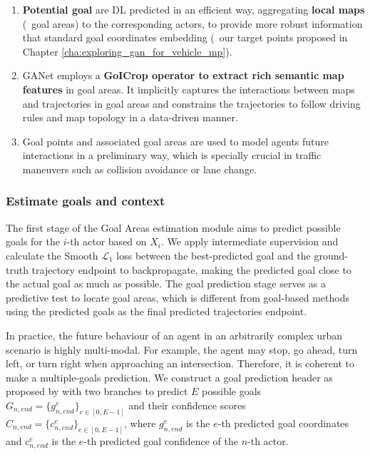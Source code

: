 \begin{enumerate}
	
	\item \textbf{Potential goal} are \ac{DL} predicted in an efficient way, aggregating \textbf{local maps} (\aka \ goal areas) to the corresponding actors, to provide more robust information that standard goal coordinates embedding (\eg \ our target points proposed in Chapter \ref{cha:exploring_gan_for_vehicle_mp}).
	
	\item GANet \cite{wang2022ganet} employs a \textbf{GoICrop operator to extract rich semantic map features} in goal areas. It implicitly captures the interactions between maps and trajectories in goal areas and constrains the trajectories to follow driving rules and map topology in a data-driven manner.
	
	\item Goal points and associated goal areas are used to model agents future interactions in a preliminary way, which is specially crucial in traffic maneuvers such as collision avoidance or lane change.
	
\end{enumerate}

\subsubsection{Estimate goals and context}
\label{subsubsec:7_improving_efficiency_estimate_goals}

The first stage of the Goal Areas estimation module aims to predict possible goals for the $i$-th actor based on $X_i$. We apply intermediate supervision and calculate the Smooth $\mathcal{L}_1$ loss between the best-predicted goal and the ground-truth trajectory endpoint to backpropagate, making the predicted goal close to the actual goal as much as possible. The goal prediction stage serves as a predictive test to locate goal areas, which is different from goal-based methods using the predicted goals as the final predicted trajectories endpoint. 

In practice, the future behaviour of an agent in an arbitrarily complex urban scenario is highly multi-modal. For example, the agent may stop, go ahead, turn left, or turn right when approaching an intersection. Therefore, it is coherent to make a multiple-goals prediction. We construct a goal prediction header as proposed by \cite{wang2022ganet} with two branches to predict $E$ possible goals $G_{n,end} =\{g_{n,end}^e\}_{e \in [0,E-1]}$ and their confidence scores $C_{n,end} = \{c_{n,end}^e\}_{e \in [0,E-1]}$, where $g_{n,end}^e$ is the $e$-th predicted goal coordinates and $c_{n,end}^e$ is the $e$-th predicted goal confidence of the $n$-th actor.

